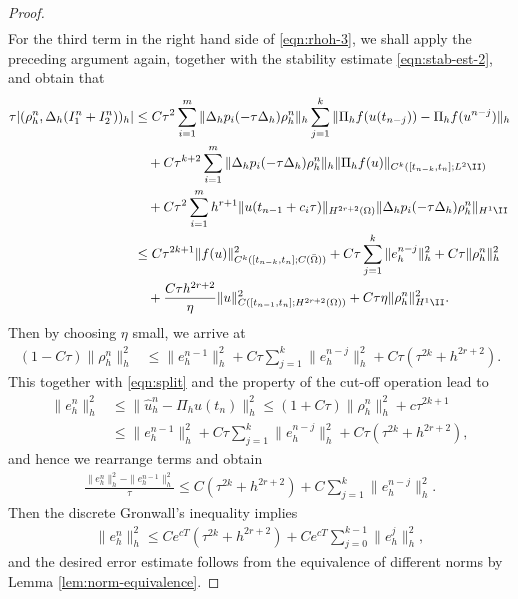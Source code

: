 \begin{proof}
\begin{equation}
\begin{split}
\end{split}
 \end{equation}
For the third term in the right hand side of \eqref{eqn:rhoh-3}, we shall apply the preceding argument again, together with the stability estimate
\eqref{eqn:stab-est-2}, and obtain that
\begin{equation}\label{eqn:fully-I3}
\begin{split}
\tau |( \rho_h^n,\Delta_h (I_1^n+I_2^n))_h| &\le  C \tau^2 \sum_{i=1}^m \|\Delta_h p_i(-\tau \Delta_h)\rho_h^n \|_h  \sum_{j=1}^k  \|\Pi_hf(u(t_{n-j}))- \Pi_h f(u^{n-j})\|_h   \\
     &\quad+  C \tau^{k+2} \sum_{i=1}^m  \| \Delta_hp_i(-\tau \Delta_h)\rho_h^n \|_h  \|  \Pi_h f(u)  \|_{C^{k}([t_{n-k},t_n]; L^2\II)} \\
&\quad+ C\tau^2 \sum_{i=1}^m h^{r+1} \| u(t_{n-1}+c_i\tau)  \|_{H^{2r+2}(\Omega)} \| \Delta_h p_i(-\tau\Delta_h) \rho_h^n \|_{H^1\II} \\
 &\le C\tau^{2k+1} \|  f(u)  \|_{C^{k}([t_{n-k},t_n]; C(\bar\Omega))}^2 + C \tau \sum_{j=1}^k \|  e_h^{n-j}  \|_h^2 +  C\tau \|  \rho_h^n \|_h^2\\
&\quad+\frac{C \tau h^{2r+2}}{\eta}  \| u  \|_{C([t_{n-1},t_n];H^{2r+2}(\Omega))}^2 + C\tau \eta  \| \rho_h^n \|_{H^1\II}^2.
\end{split}
 \end{equation}
Then by choosing $\eta$ small, we arrive at
\begin{align*}
(1-C\tau) \| \rho_h^n \|_h^2 &\le  \|  e_h^{n-1} \|_h^2   + C \tau \sum_{j=1}^k  \|  e_h^{n-j} \|_h^2
+ C\tau (\tau^{2k} + h^{2r+2}).
\end{align*}
This together with \eqref{eqn:split} and the property of the cut-off operation lead to
\begin{align*}
\| e_h^n  \|_h^2 &\le \| \hat u_h^n - \Pi_h u(t_n) \|_h^2   \le (1+C\tau) \| \rho_h^n \|_h^2 + c\tau^{2k+1}\\
&\le\| e_h^{n-1}  \|_h^2 + C \tau \sum_{j=1}^k  \|  e_h^{n-j} \|_h^2  + C\tau (\tau^{2k} + h^{2r+2}),
\end{align*}
and hence we rearrange terms and obtain
\begin{align*}
\frac{\|  e_h^n \|_h^2 -  \|  e_h^{n-1} \|_h^2 }{\tau} \le  C (\tau^{2k} + h^{2r+2})  + C  \sum_{j=1}^k \|  e_h^{n-j}  \|_h^2.
\end{align*}
Then the discrete Gronwall's inequality implies
\begin{align*}
\|  e_h^n \|_h^2  \le  C e^{cT} (\tau^{2k}+h^{2r+2})  + C e^{cT}  \sum_{j=0}^{k-1} \|  e_h^{j}  \|_h^2,
\end{align*}
and the desired error estimate follows from the equivalence of different norms by Lemma \ref{lem:norm-equivalence}.
\end{proof}


